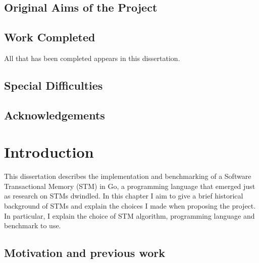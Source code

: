 \documentclass[12pt,a4paper,twoside,openright]{report}
\begin{document}
\section*{Original Aims of the Project}

\section*{Work Completed}

All that has been completed appears in this dissertation.

\section*{Special Difficulties}
 
\tableofcontents

\pagestyle{plain} 

\listoffigures{}

\listoftables{}


\newpage

\section*{Acknowledgements}



\pagestyle{headings}

\chapter{Introduction}


This dissertation describes the implementation and benchmarking of a
Software Transactional Memory (STM) in Go, a programming language that
emerged just as research on STMs dwindled. In this chapter I aim to
give a brief historical background of STMs and explain the choices I
made when proposing the project. In particular, I explain the choice
of STM algorithm, programming language and benchmark to use.

\section{Motivation and previous work}
\label{sec:motivation}
\end{document}
